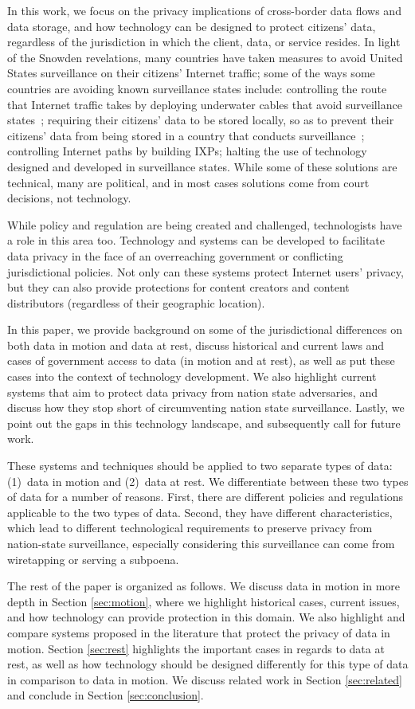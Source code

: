 In this work, we focus on the privacy implications of cross-border data flows
and data  storage, and how technology can be designed to protect citizens'
data, regardless of the  jurisdiction in which the client, data, or service
resides.  In light of  the Snowden revelations, many countries have taken
measures to avoid United States surveillance on their citizens' Internet
traffic; some of  the ways some countries are avoiding known surveillance
states include: controlling the route  that Internet traffic takes by
deploying underwater cables that avoid surveillance states~\cite{brazil};
requiring their citizens' data to be stored locally, so as to prevent their
citizens' data from  being stored in a country that conducts
surveillance~\cite{russia}; controlling Internet paths by building  IXPs;
halting the use of technology designed and developed in surveillance states.
While some of these  solutions are technical, many are political, and in most
cases solutions come from court decisions, not  technology.

While policy and regulation are being created and challenged, technologists
have a role  in this area too.  Technology and systems can be developed to
facilitate data privacy in the  face of an overreaching government or
conflicting jurisdictional policies.  Not only can  these systems protect
Internet users' privacy, but they can also provide protections  for content
creators and content distributors (regardless of their geographic location).

In this paper, we provide background on some of the jurisdictional differences
on both data in motion and data at rest, discuss historical and current laws
and cases of  government access to data (in motion and at rest), as well as
put these cases into the context  of technology development. We also highlight
current systems that aim to protect data privacy from nation  state
adversaries, and discuss how they stop short of circumventing nation state
surveillance.  Lastly, we  point out the gaps in this technology landscape,
and  subsequently call for future work.

These systems and techniques should be applied to two separate types of data:
(1)~data in motion and (2)~data at rest.  We differentiate between these two
types of data for a number of reasons.   First, there are different policies
and regulations applicable to the two types of data.  Second,  they have
different characteristics, which lead to different technological requirements
to preserve  privacy from nation-state surveillance, especially considering
this surveillance can come from   wiretapping or serving a subpoena.

The rest of the paper is organized as follows.  We discuss data in motion in
more depth in Section \ref{sec:motion}, where we highlight  historical cases,
current issues, and how technology can provide protection in this domain.  We
also highlight and compare systems proposed in the literature that protect the
privacy of data in motion. Section \ref{sec:rest} highlights the important
cases in regards to data at rest, as well as how technology should be designed
differently for this type of data in comparison to data in motion.  We discuss
related work in Section \ref{sec:related} and  conclude in Section
\ref{sec:conclusion}.
